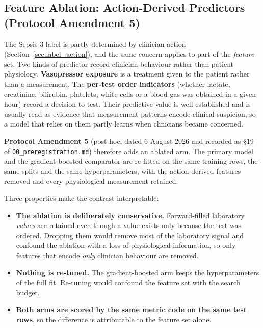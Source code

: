 \subsection{Feature Ablation: Action-Derived Predictors (Protocol Amendment 5)}
\label{sec:ablation_method}

The Sepsis-3 label is partly determined by clinician action
(Section~\ref{sec:label_action}), and the same concern applies to part of the
\emph{feature} set. Two kinds of predictor record clinician behaviour rather
than patient physiology. \textbf{Vasopressor exposure} is a treatment given to
the patient rather than a measurement. The \textbf{per-test order indicators}
(whether lactate, creatinine, bilirubin, platelets, white cells or a blood gas
was obtained in a given hour) record a decision to test. Their predictive value
is well established and is usually read as evidence that measurement patterns
encode clinical suspicion, so a model that relies on them partly learns when
clinicians became concerned.

\textbf{Protocol Amendment 5} (post-hoc, dated 6 August 2026 and recorded as
\S19 of \texttt{00\_preregistration.md}) therefore adds an ablated arm. The primary
model and the gradient-boosted comparator are re-fitted on the same training
rows, the same splits and the same hyperparameters, with the
\pcAblNDropped{} action-derived features removed and every physiological
measurement retained.

Three properties make the contrast interpretable:

\begin{itemize}
    \item \textbf{The ablation is deliberately conservative.} Forward-filled
          laboratory \emph{values} are retained even though a value exists only
          because the test was ordered. Dropping them would remove most of the
          laboratory signal and confound the ablation with a loss of
          physiological information, so only features that encode
          \emph{only} clinician behaviour are removed.
    \item \textbf{Nothing is re-tuned.} The gradient-boosted arm keeps the
          hyperparameters of the full fit. Re-tuning would confound the feature
          set with the search budget.
    \item \textbf{Both arms are scored by the same metric code on the same test
          rows}, so the difference is attributable to the feature set alone.
\end{itemize}

